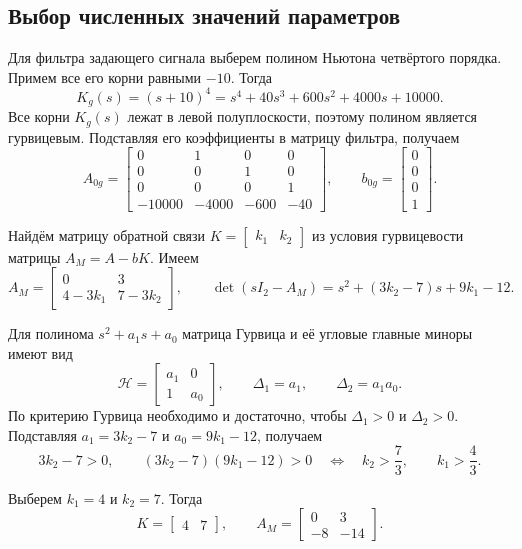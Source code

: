 \subsection{Выбор численных значений параметров}

Для фильтра задающего сигнала выберем полином Ньютона
четвёртого порядка. Примем все его корни равными $-10$. Тогда
\begin{equation}
    K_g(s)=(s+10)^4=s^4+40s^3+600s^2+4000s+10000.
    \label{eq:reference_filter_polynomial}
\end{equation}
Все корни $K_g(s)$ лежат в левой полуплоскости, поэтому полином
является гурвицевым. Подставляя его коэффициенты в матрицу
фильтра, получаем
$$
A_{0g}=
\begin{bmatrix}
     0 &  1 &  0 &  0\\
     0 &  0 &  1 &  0\\
     0 &  0 &  0 &  1\\
    -10000 & -4000 & -600 & -40
\end{bmatrix},
\qquad
b_{0g}=
\begin{bmatrix}
    0\\0\\0\\1
\end{bmatrix}.
$$

Найдём матрицу обратной связи $K=\begin{bmatrix}k_1 & k_2\end{bmatrix}$
из условия гурвицевости матрицы $A_M=A-bK$. Имеем
$$
A_M=
\begin{bmatrix}
    0 & 3\\
    4-3k_1 & 7-3k_2
\end{bmatrix},
\qquad
\det(sI_2-A_M)=s^2+(3k_2-7)s+9k_1-12.
$$

Для полинома $s^2+a_1s+a_0$ матрица Гурвица и её угловые главные
миноры имеют вид
$$
\mathcal{H}=
\begin{bmatrix}
    a_1 & 0\\
    1   & a_0
\end{bmatrix},
\qquad
\Delta_1=a_1,
\qquad
\Delta_2=a_1a_0.
$$
По критерию Гурвица необходимо и достаточно, чтобы
$\Delta_1>0$ и $\Delta_2>0$. Подставляя
$a_1=3k_2-7$ и $a_0=9k_1-12$, получаем
$$
3k_2-7>0,
\qquad
(3k_2-7)(9k_1-12)>0
\quad\Longleftrightarrow\quad
k_2>\frac{7}{3},\qquad k_1>\frac{4}{3}.
$$

Выберем $k_1=4$ и $k_2=7$. Тогда
\begin{equation}
    K=\begin{bmatrix}4 & 7\end{bmatrix},
    \qquad
    A_M=
    \begin{bmatrix}
         0 &   3\\
        -8 & -14
    \end{bmatrix}.
    \label{eq:feedback_gain}
\end{equation}

